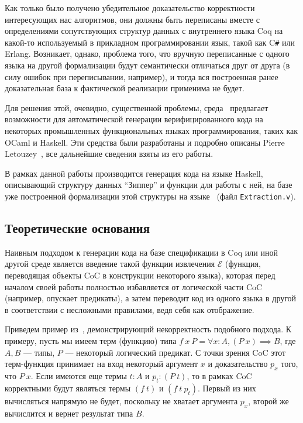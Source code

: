 Как только было получено убедительное доказательство корректности интересующих нас алгоритмов, они должны быть переписаны вместе с определениями сопутствующих структур данных с внутреннего языка Coq на какой-то используемый в прикладном программировании язык, такой как C\texttt{\#} или Erlang. Возникает, однако, проблема того, что вручную переписанные с одного языка на другой формализации будут семантически отличаться друг от друга (в силу ошибок при переписывании, например), и тогда вся построенная ранее доказательная база к фактической реализации применима не будет. 

Для решения этой, очевидно, существенной проблемы, среда \tcoq~предлагает возможности для автоматической генерации верифицированного кода на некоторых промышленных функциональных языках программирования, таких как OCaml и Haskell. Эти средства были разработаны и подробно описаны Pierre Letouzey~\autocite{Pierre2004}, все дальнейшие сведения взяты из его работы.

В рамках данной работы производится генерация кода на языке Haskell, описывающий структуру данных ``Зиппер'' и функции для работы с ней, на базе уже построенной формализации этой структуры на языке \tcoq~(файл \texttt{Extraction.v}).

\subsection{Теоретические основания}
Наивным подходом к генерации кода на базе спецификации в Coq или иной другой среде является введение такой функции извлечения $\mathcal{E}$ (функция, переводящая объекты CoC в конструкции некоторого языка), которая перед началом своей работы полностью избавляется от логической части CoC (например, опускает предикаты), а затем переводит код из одного языка в другой в соответствии с несложными правилами, ведя себя как отображение.

Приведем пример из~\autocite{Pierre2004}, демонстрирующий некорректность подобного подхода. К примеру, пусть мы имеем терм (функцию) типа $f\ x\ P = \forall x : A, (P\ x) \implies B$, где $A, B$ --- типы, $P$ --- некоторый логический предикат. С точки зрения CoC этот терм-функция принимает на вход некоторый аргумент $x$ и доказательство $p_x$ того, что $P\ x$. Если имеются еще термы $t:A$ и $p_t:(P\ t)$, то в рамках CoC корректными будут являться термы $(f\ t)$ и $(f\ t\ p_t)$. Первый из них вычисляться напрямую не будет, поскольку не хватает аргумента $p_x$, второй же вычислится и вернет результат типа $B$.

